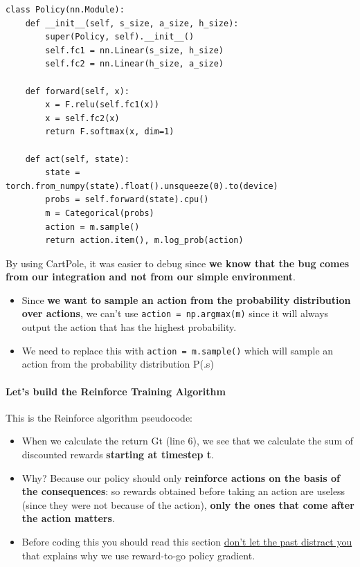 \documentclass[11pt,a4paper]{article}
\begin{document}
\begin{lstlisting}
class Policy(nn.Module):
    def __init__(self, s_size, a_size, h_size):
        super(Policy, self).__init__()
        self.fc1 = nn.Linear(s_size, h_size)
        self.fc2 = nn.Linear(h_size, a_size)

    def forward(self, x):
        x = F.relu(self.fc1(x))
        x = self.fc2(x)
        return F.softmax(x, dim=1)

    def act(self, state):
        state = torch.from_numpy(state).float().unsqueeze(0).to(device)
        probs = self.forward(state).cpu()
        m = Categorical(probs)
        action = m.sample()
        return action.item(), m.log_prob(action)
\end{lstlisting}

By using CartPole, it was easier to debug since \textbf{we know that the bug comes from our integration and not from our simple environment}.

\begin{itemize}
\item
  Since \textbf{we want to sample an action from the probability distribution over actions}, we can't use \texttt{action\ =\ np.argmax(m)} since it will always output the action that has the highest probability.
\item
  We need to replace this with \texttt{action\ =\ m.sample()} which will sample an action from the probability distribution P(.\textbar s)
\end{itemize}

\paragraph{Let's build the Reinforce Training Algorithm}\label{lets-build-the-reinforce-training-algorithm}

This is the Reinforce algorithm pseudocode:


\begin{itemize}
\item
  When we calculate the return Gt (line 6), we see that we calculate the sum of discounted rewards \textbf{starting at timestep t}.
\item
  Why? Because our policy should only \textbf{reinforce actions on the basis of the consequences}: so rewards obtained before taking an action are useless (since they were not because of the action), \textbf{only the ones that come after the action matters}.
\item
  Before coding this you should read this section \href{https://spinningup.openai.com/en/latest/spinningup/rl_intro3.html\#don-t-let-the-past-distract-you}{don't let the past distract you} that explains why we use reward-to-go policy gradient.
\end{itemize}
\end{document}
